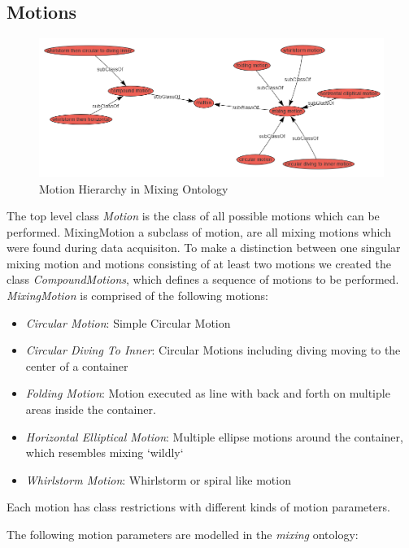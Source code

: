 \subsection{Motions}
\begin{figure}[H]
    \includegraphics[scale=0.45]{Graphics/classHierarchy/motions_hierarchy.png}
    \centering
    \caption{Motion Hierarchy in Mixing Ontology}
\end{figure}


The top level class \textit{Motion} is the class of all possible motions which can be performed. MixingMotion a subclass of motion, are all mixing motions 
which were found during data acquisiton. To make a distinction between one singular mixing motion and motions consisting of at least two motions
we created the class \textit{CompoundMotions}, which defines a sequence of motions to be performed.
\textit{MixingMotion} is comprised of the following motions:

\begin{itemize}
    \item \textit{Circular Motion}: Simple Circular Motion
    \item \textit{Circular Diving To Inner}: Circular Motions including diving moving to the center of a container
    \item \textit{Folding Motion}: Motion executed as line with back and forth on multiple areas inside the container.
    \item \textit{Horizontal Elliptical Motion}: Multiple ellipse motions around the container, which resembles mixing `wildly`
    \item \textit{Whirlstorm Motion}: Whirlstorm or spiral like motion
\end{itemize}

Each motion has class restrictions with different kinds of motion parameters.

The following motion parameters are modelled in the \textit{mixing} ontology:

